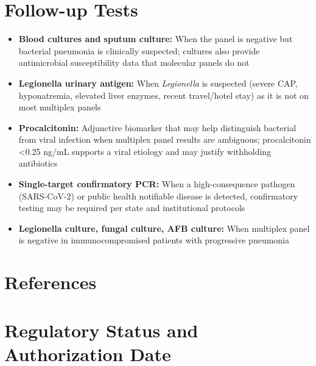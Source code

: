 \section*{Follow-up Tests}
\begin{itemize}
  \item \textbf{Blood cultures and sputum culture:} When the panel is negative but bacterial pneumonia is clinically suspected; cultures also provide antimicrobial susceptibility data that molecular panels do not
  \item \textbf{Legionella urinary antigen:} When \textit{Legionella} is suspected (severe CAP, hyponatremia, elevated liver enzymes, recent travel/hotel stay) as it is not on most multiplex panels
  \item \textbf{Procalcitonin:} Adjunctive biomarker that may help distinguish bacterial from viral infection when multiplex panel results are ambiguous; procalcitonin <0.25 ng/mL supports a viral etiology and may justify withholding antibiotics
  \item \textbf{Single-target confirmatory PCR:} When a high-consequence pathogen (SARS-CoV-2) or public health notifiable disease is detected, confirmatory testing may be required per state and institutional protocols
  \item \textbf{Legionella culture, fungal culture, AFB culture:} When multiplex panel is negative in immunocompromised patients with progressive pneumonia
\end{itemize}

\section*{References}



\clearpage
\section*{Regulatory Status and Authorization Date}

\clearpage
